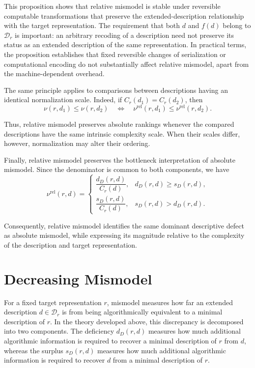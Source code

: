 This proposition shows that relative mismodel is stable under reversible computable transformations that preserve the extended-description relationship with the target representation. The requirement that both $d$ and $f(d)$ belong to $\mathcal D_r$ is important: an arbitrary recoding of a description need not preserve
its status as an extended description of the same representation. In practical terms, the proposition establishes that fixed reversible changes of serialization or computational encoding do not substantially
affect relative mismodel, apart from the machine-dependent overhead.

The same principle applies to comparisons between descriptions having an identical normalization scale. Indeed, if $C_r(d_1) = C_r(d_2)$, then
\[
\nu(r,d_1)\le\nu(r,d_2) \quad\Longleftrightarrow\quad
\nu^{\mathrm{rel}}(r,d_1) \le\nu^{\mathrm{rel}}(r,d_2).
\]

Thus, relative mismodel preserves absolute rankings whenever the compared descriptions have the same intrinsic complexity scale. When their scales differ, however, normalization may alter their ordering.

Finally, relative mismodel preserves the bottleneck interpretation of absolute mismodel. Since the denominator is common to both components, we have
\[
\nu^{\mathrm{rel}}(r,d) =
\begin{cases}
\dfrac{d_D(r,d)}{C_r(d)},
& d_D(r,d)\ge s_D(r,d), \\[10pt] \dfrac{s_D(r,d)}{C_r(d)},
& s_D(r,d)>d_D(r,d).
\end{cases}
\]

Consequently, relative mismodel identifies the same dominant descriptive defect as absolute mismodel, while expressing its magnitude relative to the complexity of the description and target representation.

%
%

\section{Decreasing Mismodel}
\label{sec:decreasing_mismodel}

For a fixed target representation $r$, mismodel measures how far an extended description $d \in \mathcal{D}_r$ is from being algorithmically equivalent to a minimal description of $r$. In the theory developed above, this discrepancy is decomposed into two components. The deficiency $d_D(r, d)$ measures how much additional algorithmic information is required to recover a minimal description of $r$ from $d$, whereas the surplus $s_D(r, d)$ measures how much additional algorithmic information is required to recover $d$ from a minimal description of $r$.

